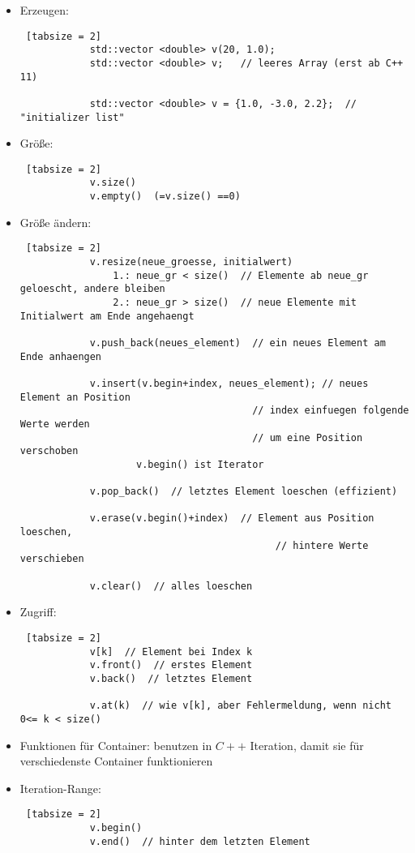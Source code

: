 \documentclass{article}
\begin{document}
	 \begin{itemize}
	 	\item Erzeugen:
	 	\begin{lstlisting} [tabsize = 2]
	 		std::vector <double> v(20, 1.0);
	 		std::vector <double> v;   // leeres Array (erst ab C++ 11)
	 		
	 		std::vector <double> v = {1.0, -3.0, 2.2};  // "initializer list"
	 	\end{lstlisting}
	 	\item Größe:
	 	\begin{lstlisting} [tabsize = 2]
	 		v.size()
	 		v.empty()  (=v.size() ==0)
	 	\end{lstlisting}
	 	\item Größe ändern:
	 	\begin{lstlisting} [tabsize = 2]
	 		v.resize(neue_groesse, initialwert)
			 	1.: neue_gr < size()  // Elemente ab neue_gr geloescht, andere bleiben
			 	2.: neue_gr > size()  // neue Elemente mit Initialwert am Ende angehaengt
			 	
	 		v.push_back(neues_element)  // ein neues Element am Ende anhaengen
	 		
	 		v.insert(v.begin+index, neues_element); // neues Element an Position
								 		// index einfuegen folgende Werte werden 
								 		// um eine Position verschoben
				 	v.begin() ist Iterator
		 	
		 	v.pop_back()  // letztes Element loeschen (effizient)
		 	
		 	v.erase(v.begin()+index)  // Element aus Position loeschen, 
										 	// hintere Werte verschieben
		 	
		 	v.clear()  // alles loeschen
	 	\end{lstlisting}
	 	\item Zugriff:
	 	\begin{lstlisting} [tabsize = 2]
	 		v[k]  // Element bei Index k
	 		v.front()  // erstes Element
	 		v.back()  // letztes Element
	 		
	 		v.at(k)  // wie v[k], aber Fehlermeldung, wenn nicht 0<= k < size()
	 	\end{lstlisting}
	 	\item Funktionen für Container: benutzen in $C++$ Iteration, damit sie für verschiedenste Container funktionieren
	 	\item Iteration-Range: 
	 	\begin{lstlisting} [tabsize = 2]
	 		v.begin()
	 		v.end()  // hinter dem letzten Element
	 		

\end{lstlisting}
\end{itemize}
\end{document}
